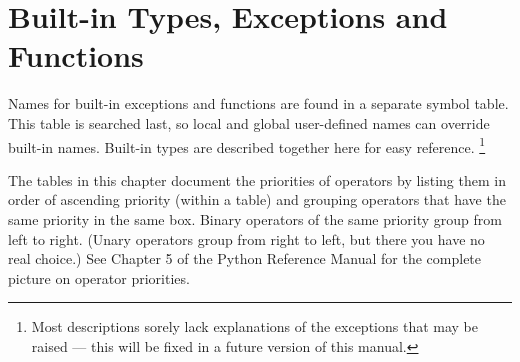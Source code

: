\chapter{Built-in Types, Exceptions and Functions}


Names for built-in exceptions and functions are found in a separate
symbol table.  This table is searched last, so local and global
user-defined names can override built-in names.  Built-in types are
described together here for easy reference.  %
\footnote{Most descriptions sorely lack explanations of the exceptions
	that may be raised --- this will be fixed in a future version of
	this manual.}

The tables in this chapter document the priorities of operators by
listing them in order of ascending priority (within a table) and
grouping operators that have the same priority in the same box.
Binary operators of the same priority group from left to right.
(Unary operators group from right to left, but there you have no real
choice.)  See Chapter 5 of the Python Reference Manual for the
complete picture on operator priorities.
